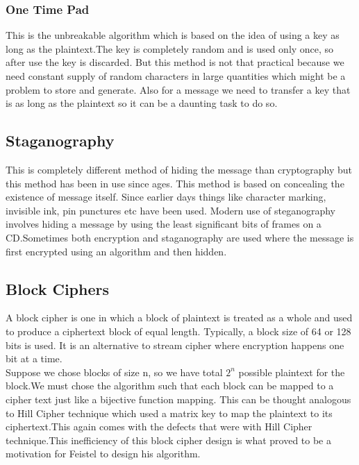 \documentclass{article}
\begin{document}
\subsubsection{One Time Pad}
This is the unbreakable algorithm which is based on the idea of using a key as long as the plaintext.The key is completely random and is used only once, so after use the key is discarded. But this method is not that practical because we need constant supply of random characters in large quantities which might be a problem to store and generate. Also for a message we need to transfer a key that is as long as the plaintext so it can be a daunting task to do so.
\subsection{Staganography}
This is completely different method of hiding the message than cryptography but this method has been in use since ages. This method is based on concealing the existence of message itself.
Since earlier days things like character marking, invisible ink, pin punctures etc have been used. Modern use of steganography involves hiding a message by using the least significant bits of frames on a CD.Sometimes both encryption and staganography are used where the message is first encrypted using an algorithm and then hidden.
\subsection{Block Ciphers}
A block cipher is one in which a block of plaintext is treated as a whole and used to produce a ciphertext block of equal length. Typically, a block size of 64 or 128 bits is used. It is an alternative to stream cipher where encryption happens one bit at a time.\\
Suppose we chose blocks of size n, so we have total $2^n$ possible plaintext for the block.We must chose the algorithm such that each block can be mapped to a cipher text just like a bijective function mapping. This can be thought analogous to Hill Cipher technique which used a matrix key to map the plaintext to its ciphertext.This again comes with the defects that were with Hill Cipher technique.This inefficiency of this block cipher design is what proved to be a motivation for Feistel to design his algorithm.
\end{document}
